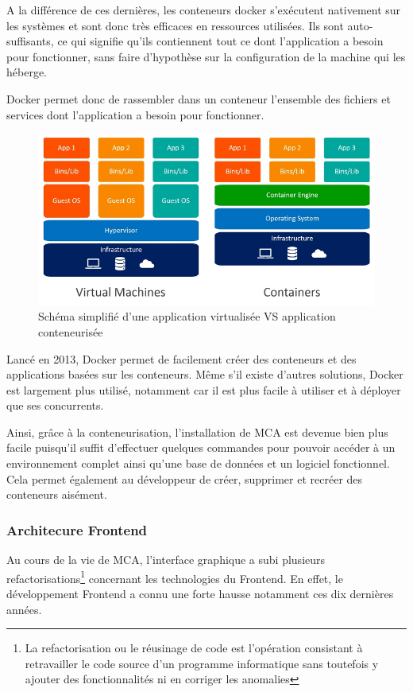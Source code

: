 A la différence de ces dernières, les conteneurs docker s'exécutent nativement sur les systèmes et sont 
donc très efficaces en ressources utilisées. Ils sont auto-suffisants, ce qui signifie qu'ils contiennent
 tout ce dont l'application a besoin pour fonctionner, sans faire d'hypothèse sur la configuration de la
  machine qui les héberge.

Docker permet donc de rassembler dans un conteneur l'ensemble des fichiers et services dont l’application a
 besoin pour fonctionner.
 \begin{figure}[hp]
    \centering
    \includegraphics{images/docker.png}
    \caption{Schéma simplifié d’une application virtualisée VS application conteneurisée}
\end{figure}

Lancé en 2013, Docker permet de facilement créer des conteneurs et des applications basées sur les conteneurs. Même s’il existe d’autres solutions, Docker est largement plus utilisé, notamment car il est plus facile à utiliser et à déployer que ses concurrents. 

Ainsi, grâce à la conteneurisation, l’installation de MCA est devenue bien plus facile puisqu'il suffit d’effectuer quelques commandes pour pouvoir accéder à un environnement complet ainsi qu’une base de données et un logiciel fonctionnel. Cela permet également au développeur de créer, supprimer et recréer des conteneurs aisément.
\pagebreak

\subsubsection{Architecure Frontend}
Au cours de la vie de MCA, l’interface graphique a subi plusieurs 
refactorisations\footnote[12]{La refactorisation ou le  réusinage de code est l'opération consistant 
à retravailler le code source d'un programme informatique sans toutefois y ajouter des fonctionnalités 
ni en corriger les anomalies} concernant les 
technologies du Frontend. En effet, le développement Frontend a connu une forte hausse notamment 
ces dix dernières années.

